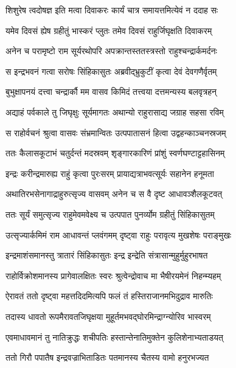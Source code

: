 \twolineshloka
{शिशुरेष त्वदोषज्ञ इति मत्वा दिवाकरः}
{कार्यं चात्र समायत्तमित्येवं न ददाह सः} %

\twolineshloka
{यमेव दिवसं ह्येष ग्रहीतुं भास्करं प्लुतः}
{तमेव दिवसं राहुर्जिघृक्षति दिवाकरम्} %

\twolineshloka
{अनेन च परामृष्टो राम सूर्यरथोपरि}
{अपक्रान्तस्ततस्त्रस्तो राहुश्चन्द्रार्कमर्दनः} %

\twolineshloka
{स इन्द्रभवनं गत्वा सरोषः सिंहिकासुतः}
{अब्रवीद्भ्रुकुटीं कृत्वा देवं देवगणैर्वृतम्} %

\twolineshloka
{बुभुक्षापनयं दत्त्वा चन्द्रार्कौ मम वासव}
{किमिदं तत्त्वया दत्तमन्यस्य बलवृत्रहन्} %

\twolineshloka
{अद्याहं पर्वकाले तु जिघृक्षुः सूर्यमागतः}
{अथान्यो राहुरासाद्य जग्राह सहसा रविम्} %

\twolineshloka
{स राहोर्वचनं श्रुत्वा वासवः संभ्रमान्वितः}
{उत्पपातासनं हित्वा उद्वहन्काञ्चनस्रजम्} %

\twolineshloka
{ततः कैलासकूटाभं चतुर्दन्तं मदस्रवम्}
{शृङ्गारकारिणं प्रांशुं स्वर्णघण्टाट्टहासिनम्} %

\twolineshloka
{इन्द्रः करीन्द्रमारुह्य राहुं कृत्वा पुरःसरम्}
{प्रायाद्यत्राभवत्सूर्यः सहानेन हनूमता} %

\twolineshloka
{अथातिरभसेनागाद्राहुरुत्सृज्य वासवम्}
{अनेन च स वै दृष्ट आधावञ्शैलकूटवत्} %

\twolineshloka
{ततः सूर्यं समुत्सृज्य राहुमेवमवेक्ष्य च}
{उत्पपात पुनर्व्योम ग्रहीतुं सिंहिकासुतम्} %

\twolineshloka
{उत्सृज्यार्कमिमं राम आधावन्तं प्लवंगमम्}
{दृष्ट्वा राहुः परावृत्य मुखशेषः पराङ्मुखः} %

\twolineshloka
{इन्द्रमाशंसमानस्तु त्रातारं सिंहिकासुतः}
{इन्द्र इन्द्रेति संत्रासान्मुहुर्मुहुरभाषत} %

\twolineshloka
{राहोर्विक्रोशमानस्य प्रागेवालक्षितः स्वरः}
{श्रुत्वेन्द्रोवाच मा भैषीरयमेनं निहन्म्यहम्} %

\twolineshloka
{ऐरावतं ततो दृष्ट्वा महत्तदिदमित्यपि}
{फलं तं हस्तिराजानमभिदुद्राव मारुतिः} %

\twolineshloka
{तदास्य धावतो रूपमैरावतजिघृक्षया}
{मुहूर्तमभवद्घोरमिन्द्राग्न्योरिव भास्वरम्} %

\twolineshloka
{एवमाधावमानं तु नातिक्रुद्धः शचीपतिः}
{हस्तान्तेनातिमुक्तेन कुलिशेनाभ्यताडयत्} %

\twolineshloka
{ततो गिरौ पपातैष इन्द्रवज्राभिताडितः}
{पतमानस्य चैतस्य वामो हनुरभज्यत} %

